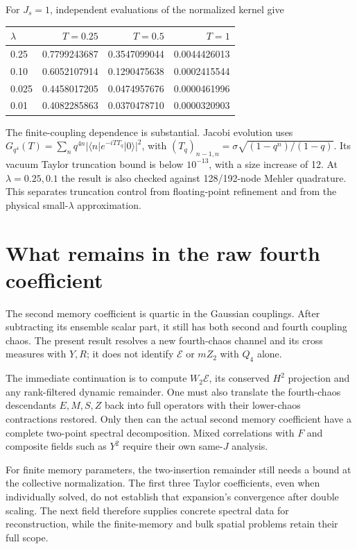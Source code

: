 \documentclass[11pt,a4paper]{article}
\begin{document}
For $J_s=1$, independent evaluations of the normalized kernel give
\begin{center}\begin{tabular}{lrrr}\toprule
$\lambda$ & $T=0.25$ & $T=0.5$ & $T=1$ \\\midrule
0.25 & 0.7799243687 & 0.3547099044 & 0.0044426013 \\
0.10 & 0.6052107914 & 0.1290475638 & 0.0002415544 \\
0.025 & 0.4458017205 & 0.0474957676 & 0.0000461996 \\
0.01 & 0.4082285863 & 0.0370478710 & 0.0000320903 \\\bottomrule
\end{tabular}\end{center}
The finite-coupling dependence is substantial. Jacobi evolution uses
$G_{q^4}(T)=\sum_nq^{4n}|\langle n|e^{-iTT_q}|0\rangle|^2$,
with $(T_q)_{n-1,n}=\sigma\sqrt{(1-q^n)/(1-q)}$.
Its vacuum Taylor truncation bound is below $10^{-13}$, with a
size increase of 12. At $\lambda=0.25,0.1$ the result is also checked
against 128/192-node Mehler quadrature. This separates truncation
control from floating-point refinement and from the physical
small-$\lambda$ approximation.

\newpage
\section{What remains in the raw fourth coefficient}
The second memory coefficient is quartic in the Gaussian couplings.
After subtracting its ensemble scalar part, it still has both second
and fourth coupling chaos. The present result resolves a new
fourth-chaos channel and its cross measures with $Y,R$; it does not
identify $\mathcal E$ or $mZ_2$ with $Q_4$ alone.

The immediate continuation is to compute $W_2\mathcal E$, its
conserved $H^2$ projection and any rank-filtered dynamic remainder.
One must also translate the fourth-chaos descendants $E,M,S,Z$
back into full operators with their lower-chaos contractions restored.
Only then can the actual second memory coefficient have a complete
two-point spectral decomposition. Mixed correlations with $F$ and
composite fields such as $Y^2$ require their own same-$J$ analysis.

For finite memory parameters, the two-insertion remainder still
needs a bound at the collective normalization. The first three
Taylor coefficients, even when individually solved, do not establish
that expansion's convergence after double scaling. The next field
therefore supplies concrete spectral data for reconstruction, while
the finite-memory and bulk spatial problems retain their full scope.
\end{document}
